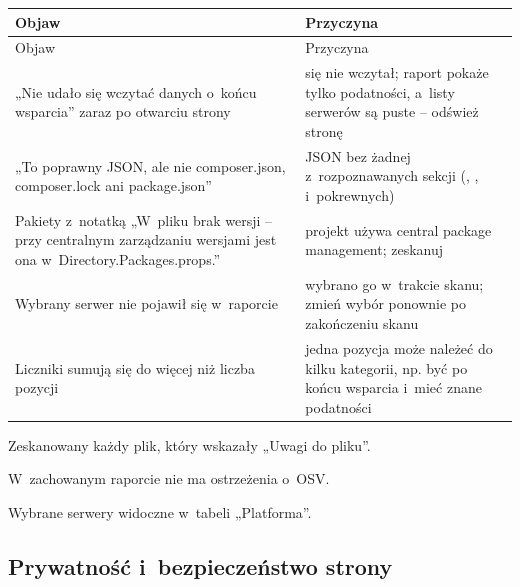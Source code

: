 \begin{xltabular}{\linewidth}{@{}>{\raggedright\arraybackslash}p{5.4cm} >{\raggedright\arraybackslash}X@{}}
\toprule
Objaw & Przyczyna \\
\midrule
\endfirsthead
\toprule
Objaw & Przyczyna \\
\midrule
\endhead
„Nie udało się wczytać danych o~końcu wsparcia” zaraz po otwarciu strony &  się nie wczytał; raport pokaże tylko podatności, a~listy serwerów są puste -- odśwież stronę \\
„To poprawny JSON, ale nie composer.json, composer.lock ani package.json” & JSON bez żadnej z~rozpoznawanych sekcji (, ,  i~pokrewnych) \\
Pakiety z~notatką „W~pliku brak wersji -- przy centralnym zarządzaniu wersjami jest ona w~Directory.Packages.props.” & projekt używa central package management; zeskanuj  \\
Wybrany serwer nie pojawił się w~raporcie & wybrano go w~trakcie skanu; zmień wybór ponownie po zakończeniu skanu \\
Liczniki sumują się do więcej niż liczba pozycji & jedna pozycja może należeć do kilku kategorii, np. być po końcu wsparcia i~mieć znane podatności \\
\bottomrule
\end{xltabular}

\begin{checklista}
  \item Zeskanowany każdy plik, który wskazały „Uwagi do pliku”.
  \item W~zachowanym raporcie nie ma ostrzeżenia o~OSV.
  \item Wybrane serwery widoczne w~tabeli „Platforma”.
\end{checklista}


\subsection{Prywatność i~bezpieczeństwo strony}\label{sec:risk-scan-prywatnosc}

